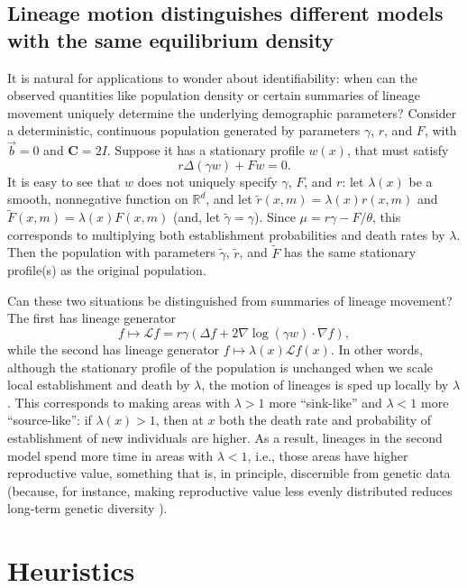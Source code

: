 \documentclass[EJP]{ejpecp} %
\newcommand{\IR}{\mathbb R}
\newcommand{\grad}{\nabla}
\newcommand{\meanq}{\vec b}    %
\newcommand{\covq}{\mathbf{C}}     %
\newcommand{\Lgen}{\mathcal{L}}    %
\newcommand{\citep}[1]{\cite{#1}}
\begin{document}
\subsection{Lineage motion distinguishes different models with the same equilibrium density}
\label{sec:nonunique_lineage}

It is natural for applications to wonder about identifiability:
when can the observed quantities like population density
or certain summaries of lineage movement uniquely determine
the underlying demographic parameters?
Consider a deterministic,
continuous population generated by parameters $\gamma$, $r$, and $F$,
with $\meanq = 0$ and $\covq = 2I$.
Suppose it has a stationary profile $w(x)$, that must satisfy
$$
   r \Delta(\gamma w) + F w = 0 .
$$
It is easy to see that $w$ does not uniquely specify $\gamma$, $F$, and $r$:
let $\lambda(x)$ be a smooth, nonnegative function on $\IR^d$,
and let $\widetilde{r}(x, m) = \lambda(x) r(x, m)$ and $\widetilde{F}(x, m) = \lambda(x) F(x, m)$
(and, let $\widetilde{\gamma} = \gamma$).
Since $\mu = r \gamma - F/\theta$,
this corresponds to multiplying both establishment probabilities and death rates by $\lambda$.
Then the population with parameters $\widetilde{\gamma}$, $\widetilde{r}$, and $\widetilde{F}$
has the same stationary profile(s) as the original population.

Can these two situations be distinguished from summaries of lineage movement?
The first has lineage generator
\[
    f \mapsto \Lgen f = r \gamma \left( \Delta f + 2 \grad \log(\gamma w) \cdot \grad f \right),
\]
while the second has lineage generator $f \mapsto \lambda(x) \Lgen f(x)$.
In other words,
although the stationary profile of the population is unchanged when we scale
local establishment and death by $\lambda$,
the motion of lineages is sped up locally by $\lambda$.
This corresponds to making areas with $\lambda > 1$ more ``sink-like'' 
and $\lambda < 1$ more ``source-like'':
if $\lambda(x) > 1$, then at $x$ both the death rate and probability of 
establishment of new individuals are higher.
As a result, lineages in the second model spend more time in areas with $\lambda < 1$,
i.e., those areas have higher reproductive value,
something that is, in principle, discernible from genetic data
(because, for instance, making reproductive value less evenly distributed
reduces long-term genetic diversity \citep{ewens:1982}). 


\section{Heuristics}
    \label{sec:heuristics}
\end{document}
